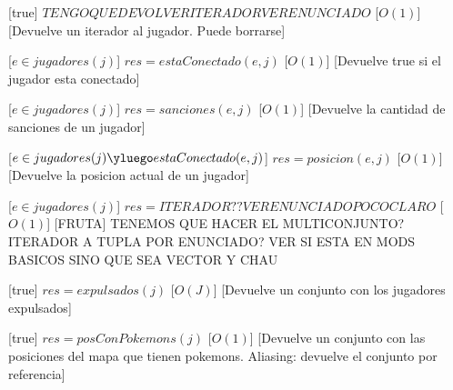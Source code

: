 \begin{Interfaz}
%
[true]
{$TENGO QUE DEVOLVER ITERADOR VER ENUNCIADO$}%
[$O(1)$] %
[Devuelve un iterador al jugador. Puede borrarse]



%
[$e \in jugadores(j)$]
{$res = estaConectado(e, j)$}%
[$O(1)$] %
[Devuelve true si el jugador esta conectado]



%
[$e \in jugadores(j)$]
{$res = sanciones(e, j)$}%
[$O(1)$] %
[Devuelve la cantidad de sanciones de un jugador]



%
[$e \in jugadores(j)  \yluego estaConectado(e, j)$]
{$res = posicion(e, j)$}%
[$O(1)$] %
[Devuelve la posicion actual de un jugador]



%
[$e \in jugadores(j)$]
{$res = ITERADOR?? VER ENUNCIADO POCO CLARO$}%
[$O(1)$] %
[FRUTA]
{TENEMOS QUE HACER EL MULTICONJUNTO? ITERADOR A TUPLA POR ENUNCIADO? VER SI ESTA EN MODS BASICOS SINO QUE SEA VECTOR Y CHAU}



%
[true]
{$res = expulsados(j)$}%
[$O(J)$]  
[Devuelve un conjunto con los jugadores expulsados]


%
[true]
{$res = posConPokemons(j)$}%
[$O(1)$] %
[Devuelve un conjunto con las posiciones del mapa que tienen pokemons. Aliasing: devuelve el conjunto por referencia]




\end{Interfaz}
